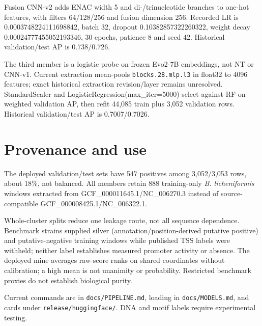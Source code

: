 \documentclass{article}
\begin{document}
Fusion CNN-v2 adds ENAC width 5 and di-/trinucleotide branches to one-hot features, with filters 64/128/256 and fusion dimension 256. Recorded LR is 0.0003748224111698842, batch 32, dropout 0.10382857322260322, weight decay 0.00024777455052193346, 30 epochs, patience 8 and seed 42. Historical validation/test AP is 0.738/0.726.

The third member is a logistic probe on frozen Evo2-7B embeddings, not NT or CNN-v1. Current extraction mean-pools \texttt{blocks.28.mlp.l3} in float32 to 4096 features; exact historical extraction revision/layer remains unresolved. StandardScaler and LogisticRegression(max\_iter=5000) select against RF on weighted validation AP, then refit 44,085 train plus 3,052 validation rows. Historical validation/test AP is 0.7007/0.7026.

\section{Provenance and use}
The deployed validation/test sets have 547 positives among 3,052/3,053 rows, about 18\%, not balanced. All members retain 888 training-only \emph{B. licheniformis} windows extracted from GCF\_000011645.1/\allowbreak{}NC\_006270.3 instead of source-compatible GCF\_000008425.1/\allowbreak{}NC\_006322.1.

Whole-cluster splits reduce one leakage route, not all sequence dependence. Benchmark strains supplied silver (annotation/position-derived putative positive) and putative-negative training windows while published TSS labels were withheld; neither label establishes measured promoter activity or absence. The deployed mine averages raw-score ranks on shared coordinates without calibration; a high mean is not unanimity or probability. Restricted benchmark proxies do not establish biological purity.

Current commands are in \texttt{docs/\allowbreak{}PIPELINE.md}, loading in \texttt{docs/\allowbreak{}MODELS.md}, and cards under \texttt{release/\allowbreak{}huggingface/}. DNA and motif labels require experimental testing.
\end{document}
